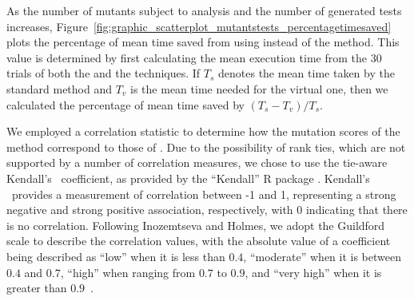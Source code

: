 
As the number of mutants subject to analysis and the number of generated tests increases, Figure~\ref{fig:graphic_scatterplot_mutantstests_percentagetimesaved} plots the percentage of mean time saved from using \vma instead of the \Original method.  This value is determined by first calculating the mean execution time from the 30 trials of both the \Standard and the \virtual techniques. If $T_s$ denotes the mean time taken by the standard method and $T_v$ is the mean time needed for the virtual one, then we calculated the percentage of mean time saved by $({T_s - T_v})/{T_s}$.


We employed a correlation statistic to determine how the mutation scores of the \tc method correspond to those of \vma.  Due to the possibility of rank ties, which are not supported by a number of correlation measures, we chose to use the tie-aware Kendall's \taub~coefficient, as provided by the ``Kendall'' R package \cite{KendallCran}.  Kendall's \taub~provides a measurement of correlation between -1 and 1, representing a strong negative and strong positive association, respectively, with 0 indicating that there is no correlation. Following Inozemtseva and Holmes, we adopt the Guildford scale to describe the correlation values, with the absolute value of a coefficient being described as ``low'' when it is less than $0.4$, ``moderate'' when it is between $0.4$ and $0.7$, ``high'' when ranging from $0.7$ to $0.9$, and ``very high'' when it is greater than \mbox{$0.9$ \cite{Inozemtseva2014}}.







